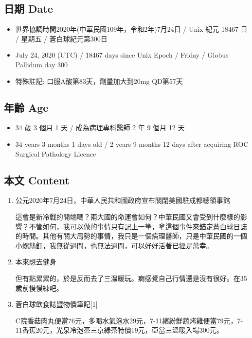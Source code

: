 \documentclass[a5paper, 11pt
]{book}
\providecommand{\tightlist}{%
  \setlength{\itemsep}{0pt}\setlength{\parskip}{0pt}}
\begin{document}
\hypertarget{ux65e5ux671f-date-47}{%
\subsection{日期 Date}\label{ux65e5ux671f-date-47}}

\begin{itemize}
\tightlist
\item
  世界協調時間2020年(中華民國109年，令和2年)7月24日 / Unix 紀元 18467 日
  / 星期五 / 蒼白球紀元第300日
\item
  July 24, 2020 (UTC) / 18467 days since Unix Epoch / Friday / Globus
  Pallidum day 300
\item
  特殊註記: 口服A酸第83天，劑量加大到20mg QD第57天
\end{itemize}

\hypertarget{ux5e74ux9f61-age-47}{%
\subsection{年齡 Age}\label{ux5e74ux9f61-age-47}}

\begin{itemize}
\tightlist
\item
  34 歲 3 個月 1 天 / 成為病理專科醫師 2 年 9 個月 12 天
\item
  34 years 3 months 1 days old / 2 years 9 months 12 days after
  acquiring ROC Surgical Pathology Licence
\end{itemize}

\hypertarget{ux672cux6587-content-47}{%
\subsection{本文 Content}\label{ux672cux6587-content-47}}

\begin{enumerate}
\def\labelenumi{\arabic{enumi}.}
\item
  公元2020年7月24日，中華人民共和國政府宣布關閉美國駐成都總領事館

  這會是新冷戰的開端嗎？兩大國的命運會如何？中華民國又會受到什麼樣的影響？不管如何，我可以做的事情只有記上一筆，拿這個事件來錨定蒼白球日誌的時間。其他有關大局勢的事情，我只是一個病理醫師，只是中華民國的一個小螺絲釘，我無從過問，也無法過問，可以好好活著已經是萬幸。
\item
  本來想去健身

  但有點累累的，於是反而去了三溫暖玩。痾感覺自己行情還是沒有很好。在35歲前慢慢練吧。
\item
  蒼白球飲食誌暨物價筆記{[}1{]}

  C院香菇肉丸便當76元，多喝水氣泡水29元，7-11繽紛鮮蔬烤雞便當79元，7-11香蕉20元，光泉冷泡茶三京綠茶特價19元，亞當三溫暖入場300元。
\end{enumerate}
\end{document}
